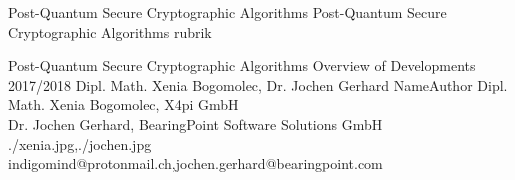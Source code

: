 \documentclass[a4paper,11pt]{article}
\begin{document}
\setcounter{footnote}{0}
\setcounter{figure}{0}


\Abschnitt
{Post-Quantum Secure Cryptographic Algorithms}
{Post-Quantum Secure Cryptographic Algorithms}
{rubrik}

\vspace{3mm}


\Aufsatz
{Post-Quantum Secure Cryptographic Algorithms}
{Overview of Developments 2017/2018}
{Dipl. Math. Xenia Bogomolec, Dr. Jochen Gerhard}
{NameAuthor}
{Dipl. Math. Xenia Bogomolec, X4pi GmbH\\ Dr. Jochen Gerhard, BearingPoint Software Solutions GmbH}
{./xenia.jpg,./jochen.jpg}
{indigomind@protonmail.ch,jochen.gerhard@bearingpoint.com}
\end{document}
